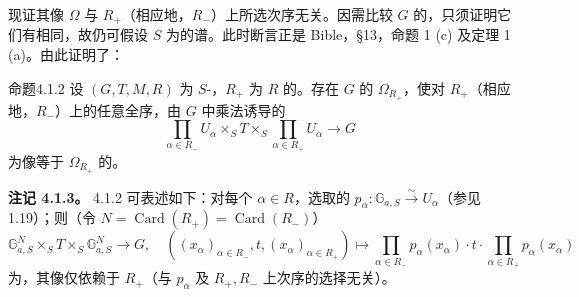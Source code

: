 现证其像 $\Omega$ 与 $R_+$（相应地，$R_-$）上所选次序无关。因需比较 $G$ 的，只须证明它们有相同，故仍可假设 $S$ 为的谱。此时断言正是 Bible，§13，命题 1 (c) 及定理 1 (a)。由此证明了：
\begin{SGAresult}{命题}{4.1.2} 设 $(G,T,M,R)$ 为 $S$-，$R_+$ 为 $R$ 的。存在 $G$ 的 $\Omega_{R_+}$，使对 $R_+$（相应地，$R_-$）上的任意全序，由 $G$ 中乘法诱导的
\[\prod_{\alpha\in R_-}U_\alpha\mathbin{\times_S}T\mathbin{\times_S}\prod_{\alpha\in R_+}U_\alpha\longrightarrow G\]
为像等于 $\Omega_{R_+}$ 的。\end{SGAresult}
\textbf{注记 4.1.3。} 4.1.2 可表述如下：对每个 $\alpha\in R$，选取的 $p_\alpha:\mathbb G_{a,S}\xrightarrow\sim U_\alpha$（参见 1.19）；则（令 $N=\operatorname{Card}(R_+)=\operatorname{Card}(R_-)$）
\[\mathbb G_{a,S}^{N}\mathbin{\times_S}T\mathbin{\times_S}\mathbb G_{a,S}^{N}\longrightarrow G,\quad ((x_\alpha)_{\alpha\in R_-},t,(x_\alpha)_{\alpha\in R_+})\longmapsto\prod_{\alpha\in R_-}p_\alpha(x_\alpha)\cdot t\cdot\prod_{\alpha\in R_+}p_\alpha(x_\alpha)\]
为，其像仅依赖于 $R_+$（与 $p_\alpha$ 及 $R_+,R_-$ 上次序的选择无关）。


